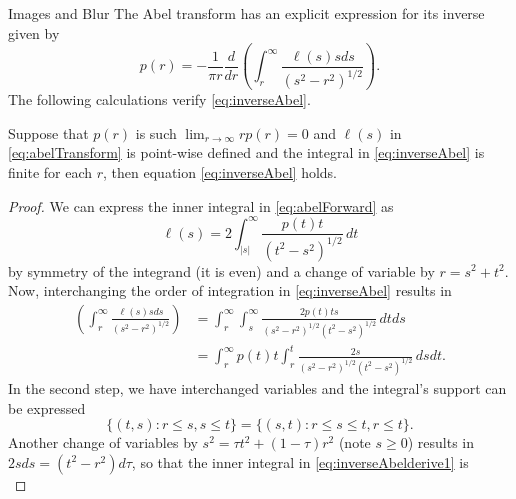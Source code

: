 \begin{chapter}{Images and Blur}
  The Abel transform has an explicit expression for its inverse \citep{epstein2008} given by
  \begin{equation} \label{eq:inverseAbel}
    p(r) = -\frac{1}{\pi r} \frac{d}{dr}\left(\int_r^\infty \frac{\ell(s) s ds}{ (s^2 - r^2)^{1/2} } \right).  
  \end{equation} 
  The following calculations verify \eqref{eq:inverseAbel}.

  \begin{prop}
    Suppose that $p(r)$ is such $\lim_{r\to\infty}rp(r) = 0$ and $\ell(s)$ in \eqref{eq:abelTransform} is point-wise defined and the integral in \eqref{eq:inverseAbel} is finite for each $r$, then equation \eqref{eq:inverseAbel} holds.
  \end{prop}
  \begin{proof}
  We can express the inner integral in \eqref{eq:abelForward} as
  \begin{equation}
    \ell(s) = 2\int_{|s|}^\infty \frac{p(t) t}{(t^2 - s^2)^{1/2}}\,dt \label{eq:abelForward2}
  \end{equation}
  by symmetry of the integrand (it is even) and a change of variable by $r = s^2 + t^2$.
  Now, interchanging the order of integration in \eqref{eq:inverseAbel} results in
  \begin{align} 
    \left(\int_r^\infty \frac{\ell(s) s ds}{ (s^2 - r^2)^{1/2} } \right)  
    &= \int_r^\infty\int_s^\infty \frac{2p(t) ts}{(s^2 - r^2)^{1/2}(t^2 - s^2)^{1/2}}\,dtds \nonumber\\
    &= \int_r^\infty p(t) t\int_r^t \frac{2s}{(s^2 - r^2)^{1/2}(t^2 - s^2)^{1/2}}\,dsdt. \label{eq:inverseAbelderive1}
  \end{align} 
  In the second step, we have interchanged variables and the integral's support can be expressed 
  \begin{equation} \label{eq:inverseAbleSupport}
    \{(t,s): r \le s, s\le t\} = \{(s,t): r\le s \le t, r\le t \}.
  \end{equation}
  Another change of variables by $s^2 = \tau t^2 + (1-\tau)r^2$ (note $s\ge0$) results in $2sds = (t^2 - r^2)d\tau$, 
  so that the inner integral in \eqref{eq:inverseAbelderive1} is
  \begin{equation}

\end{equation}
\end{proof}
\end{chapter}
